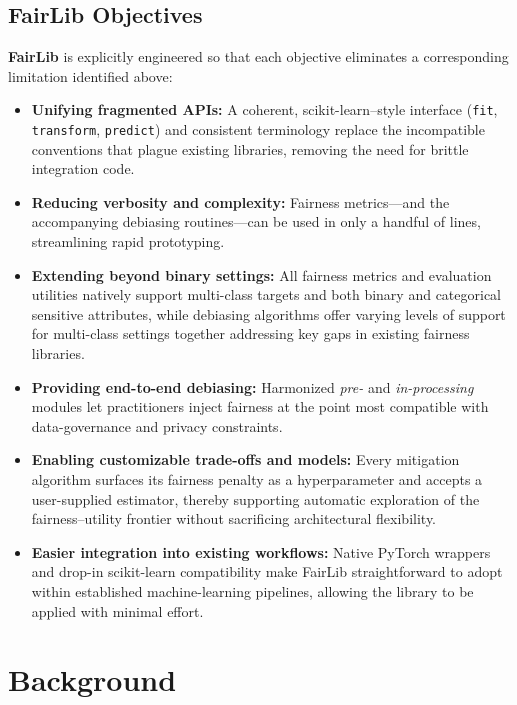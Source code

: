 \documentclass[12pt,a4paper,openright,twoside]{book}
\begin{document}
\section{FairLib Objectives}
\textbf{FairLib} is explicitly engineered so that each objective eliminates a
corresponding limitation identified above:

\begin{itemize}
  \item \textbf{Unifying fragmented APIs:}  
  A coherent, scikit-learn–style interface
  (\texttt{fit}, \texttt{transform}, \texttt{predict}) and consistent terminology
  replace the incompatible conventions that plague existing libraries,
  removing the need for brittle integration code.

  \item \textbf{Reducing verbosity and complexity:}  
  Fairness metrics—and the accompanying debiasing routines—can be used in only a handful of lines, streamlining rapid prototyping.

  \item \textbf{Extending beyond binary settings:}  
  All fairness metrics and evaluation utilities natively support multi-class targets and both binary and categorical sensitive attributes, while debiasing algorithms offer varying levels of support for multi-class settings together addressing key gaps in existing fairness libraries.

  \item \textbf{Providing end-to-end debiasing:}  
  Harmonized \emph{pre-} and \emph{in-processing} modules let practitioners inject fairness at the point most compatible with data-governance and privacy constraints.

  \item \textbf{Enabling customizable trade-offs and models:}  
  Every mitigation algorithm surfaces its fairness penalty as a hyperparameter and accepts a user-supplied estimator, thereby supporting automatic exploration of the fairness–utility frontier without sacrificing architectural flexibility.

  \item \textbf{Easier integration into existing workflows:} Native PyTorch wrappers and drop-in scikit-learn compatibility make FairLib straightforward to adopt within established machine-learning pipelines, allowing the library to be applied with minimal effort.
\end{itemize}



\chapter{Background}
\end{document}
